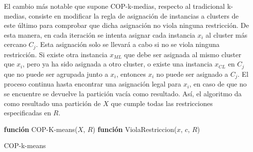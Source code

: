 El cambio más notable que supone COP-k-medias, respecto al tradicional k-medias, consiste en modificar la regla de asignación de instancias a clusters de este último para comprobar que dicha asignación no viola ninguna restricción. De esta manera, en cada iteración se intenta asignar cada instancia $x_i$ al cluster más cercano $C_j$. Esta asignación solo se llevará a cabo si no se viola ninguna restricción. Si existe otra instancia $x_{ML}$ que debe ser asignada al mismo cluster que $x_i$, pero ya ha sido asignada a otro cluster, o existe una instancia $x_{CL}$ en $C_j$ que no puede ser agrupada junto a $x_i$, entonces $x_i$ no puede ser asignado a $C_j$. El proceso continua hasta encontrar una asignación legal para $x_i$, en caso de que no se encuentre se devuelve la partición vacía como resultado. Así, el algoritmo da como resultado una partición de $X$ que cumple todas las restricciones especificadas en $R$.


\begin{algorithm}
	
	\BlankLine
	\BlankLine
	\textbf{función} COP-K-means($X$, $R$) 
	\BlankLine
	\BlankLine
	\textbf{función} ViolaRestriccion($x$, $c$, $R$) 
	
	\caption{COP-k-means}\label{alg:ckm}
\end{algorithm}











